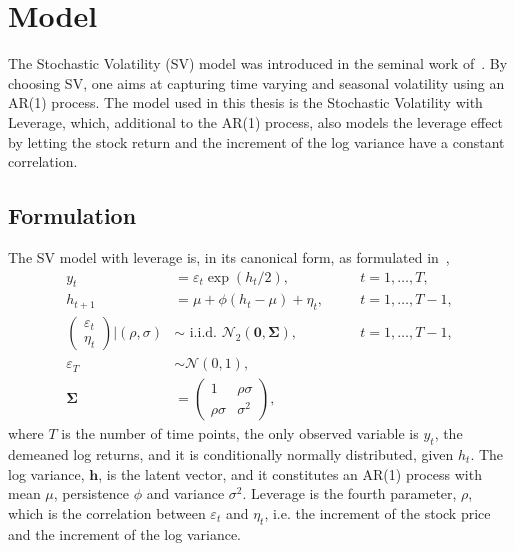 \newcommand*{\yts}{y_t^\ast}
\newcommand*{\ets}{\varepsilon_t^\ast}

\section{Model}

The Stochastic Volatility (SV) model was introduced in the seminal work of~\citet{Taylor1982}.
By choosing SV, one aims at capturing time varying and seasonal volatility using an AR(1) process.
The model used in this thesis is the Stochastic Volatility with Leverage, which, additional to the AR(1) process, also models the leverage effect by letting the stock return and the increment of the log variance have a constant correlation.

\subsection{Formulation}

The SV model with leverage is, in its canonical form, as formulated in~\citet{Omori2007},
\begin{equation}
\begin{alignedat}{2}\label{form:orig_model}
y_t & = \varepsilon_t\exp\left(h_t/2\right), && \quad t=1,\dots,T, \\
h_{t+1} & = \mu+\phi(h_t-\mu)+\eta_t, && \quad t=1,\dots,T-1, \\
\begin{pmatrix}
\varepsilon_t \\
\eta_t
\end{pmatrix}
\bigg\vert\left(\rho,\sigma\right) & \sim\text{ i.i.d. }\mathcal{N}_2\left(\bm{0},\bm{\Sigma}\right), && \quad t=1,\dots,T-1, \\
\varepsilon_T &\sim\mathcal{N}(0,1), \\
\bm{\Sigma} & =
\begin{pmatrix}
1 & \rho\sigma \\
\rho\sigma & \sigma^2
\end{pmatrix},
\end{alignedat}
\end{equation}
where $T$ is the number of time points, the only observed variable is $y_t$, the demeaned log returns, and it is conditionally normally distributed, given $h_t$.
The log variance, $\bm{h}$, is the latent vector, and it constitutes an AR(1) process with mean $\mu$, persistence $\phi$ and variance $\sigma^2$.
Leverage is the fourth parameter, $\rho$, which is the correlation between $\varepsilon_t$ and $\eta_t$, i.e. the increment of the stock price and the increment of the log variance.

